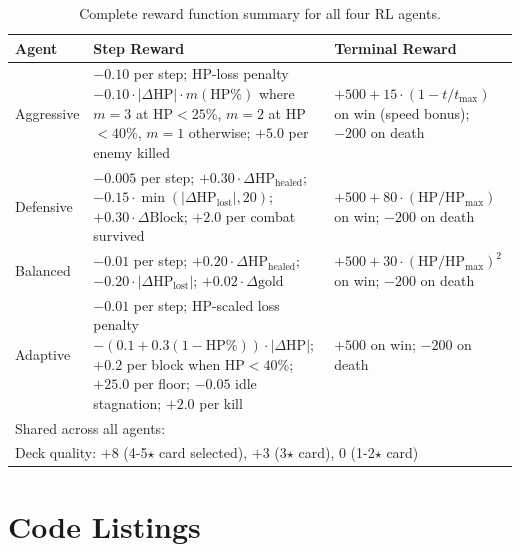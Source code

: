 \begin{table}[htbp]
    \centering
    \caption{Complete reward function summary for all four RL agents.}
    \label{tab:rewards_summary}
    \small
    \begin{tabular}{p{2.2cm}p{4.5cm}p{4.5cm}}
        \toprule
        Agent & Step Reward & Terminal Reward \\
        \midrule
        Aggressive
        & $-0.10$ per step; HP-loss penalty $-0.10 \cdot |\Delta\text{HP}| \cdot m(\text{HP\%})$ where $m\!=\!3$ at HP$<\!25\%$, $m\!=\!2$ at HP$<\!40\%$, $m\!=\!1$ otherwise; $+5.0$ per enemy killed
        & $+500 + 15 \cdot (1 - t/t_{\max})$ on win (speed bonus); $-200$ on death \\
        \midrule
        Defensive
        & $-0.005$ per step; $+0.30 \cdot \Delta\text{HP}_{\text{healed}}$; $-0.15 \cdot \min(|\Delta\text{HP}_{\text{lost}}|, 20)$; $+0.30 \cdot \Delta\text{Block}$; $+2.0$ per combat survived
        & $+500 + 80 \cdot (\text{HP}/\text{HP}_{\max})$ on win; $-200$ on death \\
        \midrule
        Balanced
        & $-0.01$ per step; $+0.20 \cdot \Delta\text{HP}_{\text{healed}}$; $-0.20 \cdot |\Delta\text{HP}_{\text{lost}}|$; $+0.02 \cdot \Delta\text{gold}$
        & $+500 + 30 \cdot (\text{HP}/\text{HP}_{\max})^2$ on win; $-200$ on death \\
        \midrule
        Adaptive
        & $-0.01$ per step; HP-scaled loss penalty $-(0.1 + 0.3(1\!-\!\text{HP\%})) \cdot |\Delta\text{HP}|$; $+0.2$ per block when HP$<\!40\%$; $+25.0$ per floor; $-0.05$ idle stagnation; $+2.0$ per kill
        & $+500$ on win; $-200$ on death \\
        \midrule
        \multicolumn{3}{l}{Shared across all agents:} \\
        \multicolumn{3}{l}{Deck quality: $+8$ (4-5$\star$ card selected), $+3$ (3$\star$ card), $0$ (1-2$\star$ card)} \\
        \bottomrule
    \end{tabular}
\end{table}

\section*{Code Listings}
\label{app:listings}

